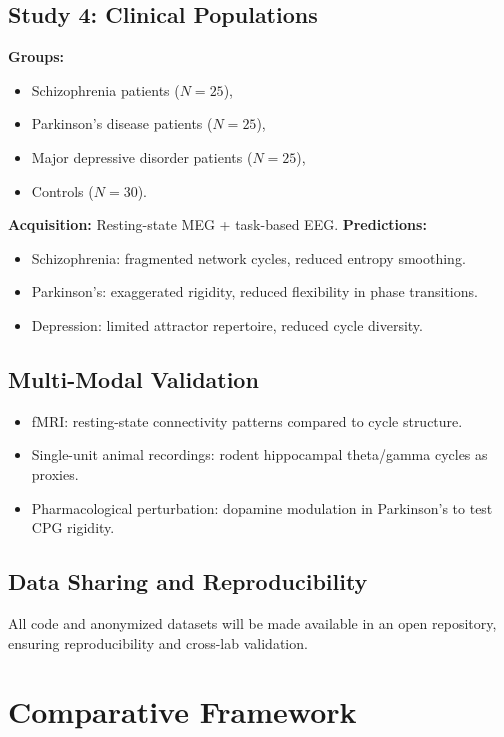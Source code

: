 \documentclass{article}
\begin{document}
\subsection{Study 4: Clinical Populations}

\textbf{Groups:}  
\begin{itemize}
    \item Schizophrenia patients ($N=25$),  
    \item Parkinson’s disease patients ($N=25$),  
    \item Major depressive disorder patients ($N=25$),  
    \item Controls ($N=30$).  
\end{itemize}  
\textbf{Acquisition:} Resting-state MEG + task-based EEG.  
\textbf{Predictions:}  
\begin{itemize}
    \item Schizophrenia: fragmented network cycles, reduced entropy smoothing.  
    \item Parkinson’s: exaggerated rigidity, reduced flexibility in phase transitions.  
    \item Depression: limited attractor repertoire, reduced cycle diversity.  
\end{itemize}  

\subsection{Multi-Modal Validation}

\begin{itemize}
    \item fMRI: resting-state connectivity patterns compared to cycle structure.  
    \item Single-unit animal recordings: rodent hippocampal theta/gamma cycles as proxies.  
    \item Pharmacological perturbation: dopamine modulation in Parkinson’s to test CPG rigidity.  
\end{itemize}  

\subsection{Data Sharing and Reproducibility}

All code and anonymized datasets will be made available in an open repository, 
ensuring reproducibility and cross-lab validation.  

\section{Comparative Framework}
\label{app:comparative}
\end{document}
